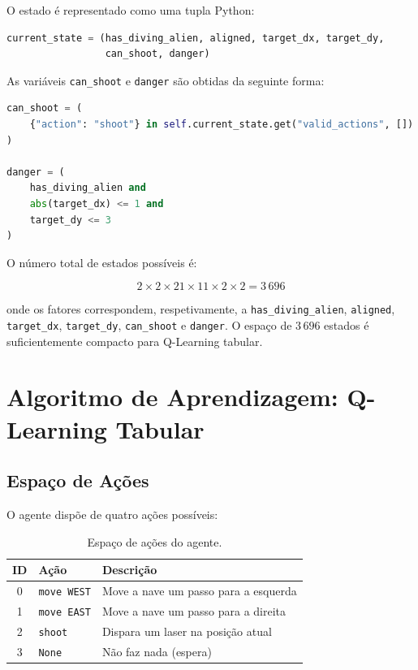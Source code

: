 \documentclass[12pt,a4paper]{article}
\begin{document}
O estado é representado como uma tupla Python:

\begin{lstlisting}[language=Python, caption={Construção do estado abstraído}]
current_state = (has_diving_alien, aligned, target_dx, target_dy,
                 can_shoot, danger)
\end{lstlisting}

As variáveis \texttt{can\_shoot} e \texttt{danger} são obtidas da seguinte forma:

\begin{lstlisting}[language=Python, caption={Obtenção das variáveis \texttt{can\_shoot} e \texttt{danger}}]
can_shoot = (
    {"action": "shoot"} in self.current_state.get("valid_actions", [])
)

danger = (
    has_diving_alien and
    abs(target_dx) <= 1 and
    target_dy <= 3
)
\end{lstlisting}

O número total de estados possíveis é:

\begin{equation}
    2 \times 2 \times 21 \times 11 \times 2 \times 2 = 3\,696
    \label{eq:estados}
\end{equation}

onde os fatores correspondem, respetivamente, a \texttt{has\_diving\_alien}, \texttt{aligned},
\texttt{target\_dx}, \texttt{target\_dy}, \texttt{can\_shoot} e \texttt{danger}.
O espaço de $3\,696$ estados é suficientemente compacto para Q-Learning tabular.

\section{Algoritmo de Aprendizagem: Q-Learning Tabular}
\label{sec:qlearning}

\subsection{Espaço de Ações}

O agente dispõe de quatro ações possíveis:

\begin{table}[H]
    \centering
    \begin{tabular}{@{}cll@{}}
        \toprule
        \textbf{ID} & \textbf{Ação} & \textbf{Descrição} \\
        \midrule
        0 & \texttt{move WEST} & Move a nave um passo para a esquerda \\
        1 & \texttt{move EAST} & Move a nave um passo para a direita \\
        2 & \texttt{shoot}     & Dispara um laser na posição atual \\
        3 & \texttt{None}      & Não faz nada (espera) \\
        \bottomrule
    \end{tabular}
    \caption{Espaço de ações do agente.}
    \label{tab:actions}
\end{table}
\end{document}
